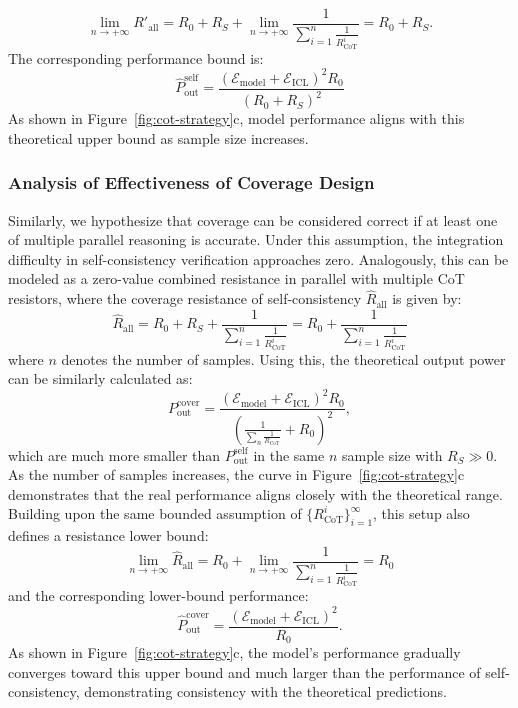 \begin{equation}
    \lim_{n\rightarrow +\infty}R'_{\text{all}} = R_0 + R_S + \lim_{n\rightarrow +\infty}\frac{1}{\sum_{i=1}^n\frac{1}{R_{\text{CoT}}^i}} = R_0 + R_S.
\end{equation}
The corresponding performance bound is:
\begin{equation}
    \hat{P}^{\text{self}}_{\text{out}} = \frac{\left(\mathcal{E}_{\text{model}} + \mathcal{E}_{\text{ICL}}\right)^2 R_0}{(R_0+R_S)^2}
\end{equation}
As shown in Figure~\ref{fig:cot-strategy}c, model performance aligns with this theoretical upper bound as sample size increases.



\subsubsection{Analysis of Effectiveness of Coverage Design}
Similarly, we hypothesize that coverage can be considered correct if at least one of multiple parallel reasoning is accurate. Under this assumption, the integration difficulty in self-consistency verification approaches zero. Analogously, this can be modeled as a zero-value combined resistance in parallel with multiple CoT resistors, where the coverage resistance of self-consistency $\hat{R}_{\text{all}}$ is given by:
\begin{equation}
    \hat{R}_{\text{all}} = R_0 + R_S + \frac{1}{\sum_{i=1}^n\frac{1}{R_{\text{CoT}}^i}}= R_0 + \frac{1}{\sum_{i=1}^n\frac{1}{R_{\text{CoT}}^i}}
\end{equation}
where $n$ denotes the number of samples. Using this, the theoretical output power can be similarly calculated as:
\begin{equation}
    P^{\text{cover}}_{\text{out}} = \frac{\left(\mathcal{E}_{\text{model}} + \mathcal{E}_{\text{ICL}}\right)^2 R_0}{(\frac{1}{\sum_n\frac{1}{R_{\text{CoT}}}} + R_0)^2},\label{eq:p-cover}
\end{equation}
which are much more smaller than $P^{\text{self}}_{\text{out}}$ in the same $n$ sample size with $R_S \gg 0$. 
As the number of samples increases, the curve in Figure~\ref{fig:cot-strategy}c demonstrates that the real performance aligns closely with the theoretical range. Building upon the same bounded assumption of \(\{R_{\text{CoT}}^i\}_{i=1}^\infty\), this setup also defines a resistance lower bound:
\begin{equation}
    \lim_{n\rightarrow +\infty}\hat{R}_{\text{all}} = R_0 + \lim_{n\rightarrow +\infty}\frac{1}{\sum_{i=1}^n\frac{1}{R_{\text{CoT}}^i}} = R_0
\end{equation}
and the corresponding lower-bound performance:
\begin{equation}
    \hat{P}^{\text{cover}}_{\text{out}} = \frac{\left(\mathcal{E}_{\text{model}} + \mathcal{E}_{\text{ICL}}\right)^2}{R_0}.
\end{equation}
As shown in Figure~\ref{fig:cot-strategy}c, the model's performance gradually converges toward this upper bound and much larger than the performance of self-consistency, demonstrating consistency with the theoretical predictions.

